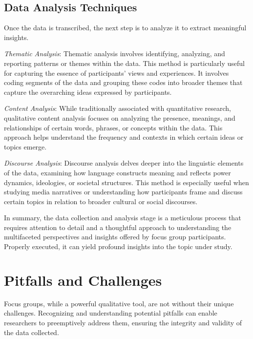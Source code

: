 \documentclass[
  b5paper]{book}
\begin{document}
\hypertarget{data-analysis-techniques}{%
\subsection*{Data Analysis Techniques}\label{data-analysis-techniques}}

Once the data is transcribed, the next step is to analyze it to extract meaningful insights.

\emph{Thematic Analysis}: Thematic analysis involves identifying, analyzing, and reporting patterns or themes within the data. This method is particularly useful for capturing the essence of participants' views and experiences. It involves coding segments of the data and grouping these codes into broader themes that capture the overarching ideas expressed by participants.

\emph{Content Analysis}: While traditionally associated with quantitative research, qualitative content analysis focuses on analyzing the presence, meanings, and relationships of certain words, phrases, or concepts within the data. This approach helps understand the frequency and contexts in which certain ideas or topics emerge.

\emph{Discourse Analysis}: Discourse analysis delves deeper into the linguistic elements of the data, examining how language constructs meaning and reflects power dynamics, ideologies, or societal structures. This method is especially useful when studying media narratives or understanding how participants frame and discuss certain topics in relation to broader cultural or social discourses.

In summary, the data collection and analysis stage is a meticulous process that requires attention to detail and a thoughtful approach to understanding the multifaceted perspectives and insights offered by focus group participants. Properly executed, it can yield profound insights into the topic under study.

\hypertarget{pitfalls-and-challenges}{%
\section{Pitfalls and Challenges}\label{pitfalls-and-challenges}}

Focus groups, while a powerful qualitative tool, are not without their unique challenges. Recognizing and understanding potential pitfalls can enable researchers to preemptively address them, ensuring the integrity and validity of the data collected.
\end{document}
